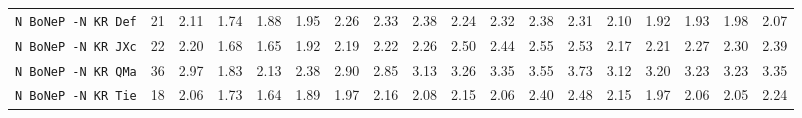 \begin{tabular}{l | r r | r r r r r r r r r r r r r r r |}
\verb+N BoNeP -N KR Def+ & 21 & 2.11 & 1.74&1.88&1.95&2.26&2.33&2.38&2.24&2.32&2.38&2.31&2.10&1.92&1.93&1.98&2.07\\
\verb+N BoNeP -N KR JXc+ & 22 & 2.20 & 1.68&1.65&1.92&2.19&2.22&2.26&2.50&2.44&2.55&2.53&2.17&2.21&2.27&2.30&2.39\\
\verb+N BoNeP -N KR QMa+ & 36 & 2.97 & 1.83&2.13&2.38&2.90&2.85&3.13&3.26&3.35&3.55&3.73&3.12&3.20&3.23&3.23&3.35\\
\verb+N BoNeP -N KR Tie+ & 18 & 2.06 & 1.73&1.64&1.89&1.97&2.16&2.08&2.15&2.06&2.40&2.48&2.15&1.97&2.06&2.05&2.24\\
\end{tabular}
